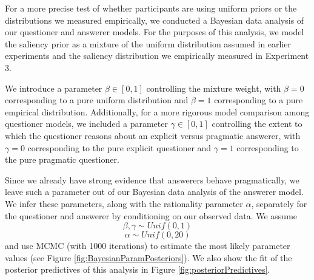 \documentclass[12pt, floatsintext, jou]{apa6}
\begin{document}
For a more precise test of whether participants are using uniform priors or the distributions we measured empirically, we conducted a Bayesian data analysis of our questioner and answerer models. For the purposes of this analysis, we model the saliency prior as a mixture of the uniform distribution assumed in earlier experiments and the saliency distribution we empirically measured in Experiment 3. 

We introduce a parameter $\beta \in [0,1]$ controlling the mixture weight, with $\beta = 0$ corresponding to a pure uniform distribution and $\beta = 1$ corresponding to a pure empirical distribution. Additionally, for a more rigorous model comparison among questioner models, we included a parameter $\gamma \in [0,1]$ controlling the extent to which the questioner reasons about an explicit versus pragmatic answerer, with $\gamma = 0$ corresponding to the pure explicit questioner and $\gamma = 1$ corresponding to the pure pragmatic questioner. 

Since we already have strong evidence that answerers behave pragmatically, we leave such a parameter out of our Bayesian data analysis of the answerer model. We infer these parameters, along with the rationality parameter $\alpha$, separately for the questioner and answerer by conditioning on our observed data. We assume $$\beta, \gamma \sim Unif(0,1)$$ $$\alpha \sim Unif(0,20)$$ and use MCMC (with 1000 iterations) to estimate the most likely parameter values (see Figure \ref{fig:BayesianParamPosteriors}). We also show the fit of the posterior predictives of this analysis in Figure \ref{fig:posteriorPredictives}.
\end{document}
